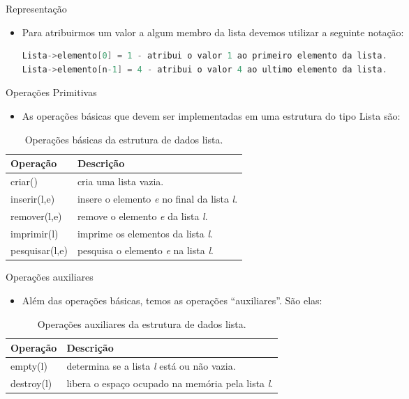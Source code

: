 \begin{frame}[fragile,c]{Representação}
\begin{itemize}
	\item Para atribuirmos um valor a algum membro da lista devemos utilizar a seguinte notação:

\small	
\begin{lstlisting}[language=C]
Lista->elemento[0] = 1 - atribui o valor 1 ao primeiro elemento da lista.
Lista->elemento[n-1] = 4 - atribui o valor 4 ao ultimo elemento da lista.
\end{lstlisting}
\end{itemize}
\end{frame}  

\begin{frame}{Operações Primitivas}
  \begin{itemize}
	  \item As operações básicas que devem ser implementadas em uma estrutura do tipo Lista são:		
  \end{itemize}
  \begin{table}[!htpb]
			  \centering
						\begin{tabular}{l|l}
						    \hline \textbf{Operação} & \textbf{Descrição} \\
						    \hline criar() & cria uma lista vazia.\\
						    \hline inserir(l,e) & insere o elemento \textit{e} no final da lista \textit{l}.\\
						    \hline remover(l,e) & remove o elemento \textit{e} da lista \textit{l}.\\
						    \hline imprimir(l) & imprime os elementos da lista \textit{l}.\\
						    \hline pesquisar(l,e) & pesquisa o elemento \textit{e} na lista \textit{l}.\\
						    \hline 
						\end{tabular}
						\caption{Operações básicas da estrutura de dados lista.}
				\end{table}
\end{frame}
 
\begin{frame}{Operações auxiliares}   
			\begin{itemize}
				\item Além das operações básicas, temos as operações ``auxiliares''. São elas:
			\end{itemize}
			\begin{table}[!htpb]
			  \centering
						\begin{tabular}{l|l}
						    \hline \textbf{Operação} & \textbf{Descrição} \\						    
						    \hline empty(l) & determina se a lista \textit{l} está ou não vazia.\\
						    \hline destroy(l) & libera o espaço ocupado na memória pela lista \textit{l}.\\
						    \hline 
						\end{tabular}
						\caption{Operações auxiliares da estrutura de dados lista.}
				\end{table}
  \end{frame}


